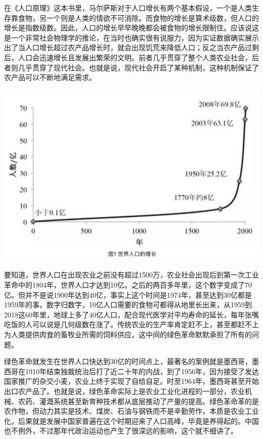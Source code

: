 \documentclass[
]{book}
\begin{document}
在《人口原理》这本书里，马尔萨斯对于人口增长有两个基本假设，一个是人类生存靠食物，另一个则是人类的情欲不可消除。而食物的增长是算术级数，但人口的增长是指数级数。因此，人口的增长早早晚晚都会被食物的增长限制住。应该说这是一个非常社会物理学的推论，在当时也确实很有说服力，因为实证数据确实展示出了当人口增长超过农产品增长时，就会出现饥荒来降低人口；反之当农产品过剩后，人口会迅速增长且发展出繁荣的文明。前者几乎贯穿了整个人类农业社会，后者则几乎贯穿了现代社会。也就是说，现代社会开启了某种机制，这种机制保证了农产品可以不断地满足需求。

\includegraphics[width=6.67in]{images/renkou1}

要知道，世界人口在出现农业之前没有超过1500万，农业社会出现后到第一次工业革命中的1804年，世界人口才达到10亿。之后的两百多年里，这个数字变成了70亿。但并不是说1900年达到40亿，事实上这个时间是1974年，甚至达到30亿都是1959年的事。数字归数字，10亿人口需要的食物可都得从地里长出来，从1959到2018这60年里，地球上多了40亿人口，配合现代医学对平均寿命的延长，每年张嘴吃饭的人可以说是几何级数在涨了。传统农业的生产率肯定赶不上，甚至都赶不上为人类提供肉食的畜牧业所需的饲料供应，这中间的绿色革命默默承担了所有的问题。

绿色革命就发生在世界人口快达到30亿的时间点上，最著名的案例就是墨西哥，墨西哥在1910年结束独裁统治后打了近二十年的内战，到了1956年，因为接受了发达国家推广的杂交小麦，农业上终于实现了自给自足。时至1964年，墨西哥甚至开始出口农产品了。也就是说，绿色革命实际上是农业工业化进程的一部分，农业机械、农药、灌溉系统甚至新育种技术都从底层推动了产量的提高。绿色革命革的是农作物，但动力其实是技术、煤炭、石油与钢铁而不是辛勤劳作，本质是农业工业化，后果就是发展中国家普遍在这个时期迎来了人口高峰，毕竟是养得起的。中国也不例外，不过那年代政治运动也产生了很深远的影响，这个就不细讲了。
\end{document}
